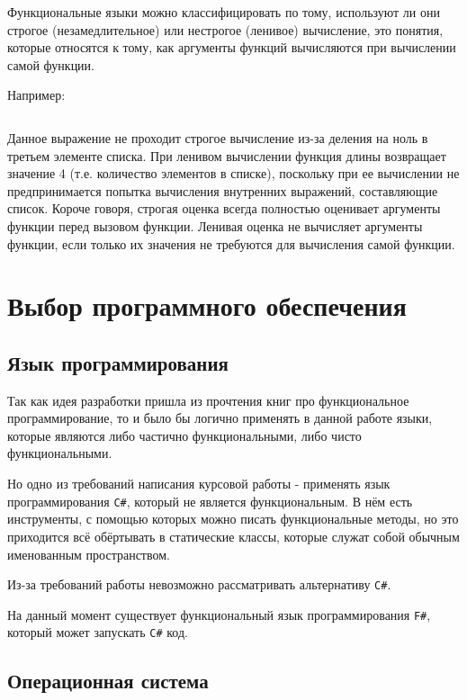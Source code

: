 Функциональные языки можно классифицировать по тому, используют ли они строгое (незамедлительное) или нестрогое (ленивое) вычисление, это понятия, которые относятся к тому, как аргументы функций вычисляются при вычислении самой функции.

Например:

\begin{code}
	\inputminted[tabsize=2,breaklines]{python}{src/evaluation.py}
\end{code}

Данное выражение не проходит строгое вычисление из-за деления на ноль в третьем элементе списка.
При ленивом вычислении функция длины возвращает значение 4 (т.е. количество элементов в списке), поскольку при ее вычислении не предпринимается попытка вычисления внутренних выражений, составляющие список.
Короче говоря, строгая оценка всегда полностью оценивает аргументы функции перед вызовом функции.
Ленивая оценка не вычисляет аргументы функции, если только их значения не требуются для вычисления самой функции.


\newpage
\section{Выбор программного обеспечения}

\subsection{Язык программирования}

Так как идея разработки пришла из прочтения книг про функциональное программирование, то и было бы логично применять в данной работе языки, которые являются либо частично функциональными, либо чисто функциональными.

Но одно из требований написания курсовой работы - применять язык программирования \texttt{C\#}, который не является функциональным.
В нём есть инструменты, с помощью которых можно писать функциональные методы, но это приходится всё обёртывать в статические классы, которые служат собой обычным именованным пространством.

Из-за требований работы невозможно рассматривать альтернативу \texttt{C\#}.

На данный момент существует функциональный язык программирования \texttt{F\#}, который может запускать \texttt{C\#} код.

\subsection{Операционная система}

